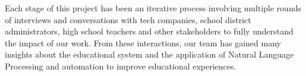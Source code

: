Each stage of this project has been an iterative process involving multiple rounds of interviews and conversations with tech companies, school district administrators, high school teachers and other stakeholders to fully understand the impact of our work. From these interactions, our team has gained many insights about the educational system and the application of Natural Language Processing and automation to improve educational experiences.


